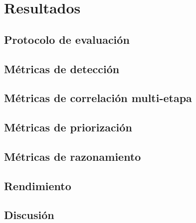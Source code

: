 \chapter{Resultados}
\label{cap:resultados}


\section{Protocolo de evaluación}

\section{Métricas de detección}

\section{Métricas de correlación multi-etapa}

\section{Métricas de priorización}

\section{Métricas de razonamiento}

\section{Rendimiento}

\section{Discusión}
